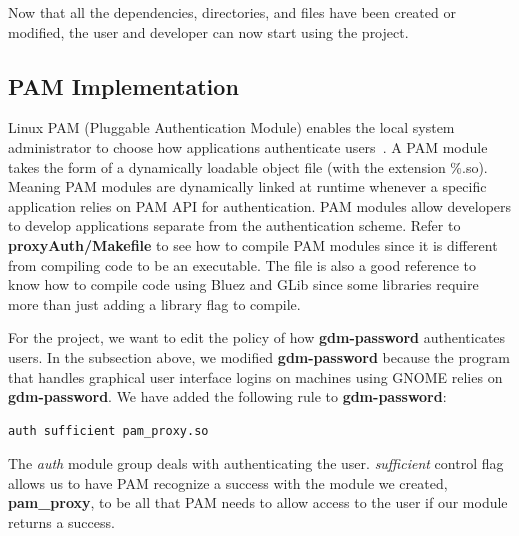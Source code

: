\documentclass[letterpaper,twocolumn,10pt]{article}
\begin{document}
Now that all the dependencies, directories, and files have been created or modified, the user and developer can now start using the project.
\label{prerequisite}

\subsection{PAM Implementation}
Linux PAM (Pluggable Authentication Module) enables the local system administrator to choose how applications authenticate users~\cite{pam}. A PAM module takes the form of a dynamically loadable object file (with the extension \%.so). Meaning PAM modules are dynamically linked at runtime whenever a specific application relies on PAM API for authentication. PAM modules allow developers to develop applications separate from the authentication scheme. Refer to \textbf{proxyAuth/Makefile} to see how to compile PAM modules since it is different from compiling code to be an executable. The file is also a good reference to know how to compile code using Bluez and GLib since some libraries require more than just adding a library flag to compile.

For the project, we want to edit the policy of how \textbf{gdm-password} authenticates users. In the subsection above, we modified \textbf{gdm-password} because the program that handles graphical user interface logins on machines using GNOME relies on \textbf{gdm-password}. We have added the following rule to \textbf{gdm-password}:
{\small
\begin{lstlisting}
auth sufficient pam_proxy.so
\end{lstlisting}
}
The \emph{auth} module group deals with authenticating the user. \emph{sufficient} control flag allows us to have PAM recognize a success with the module we created, \textbf{pam\_proxy}, to be all that PAM needs to allow access to the user if our module returns a success.
\end{document}
